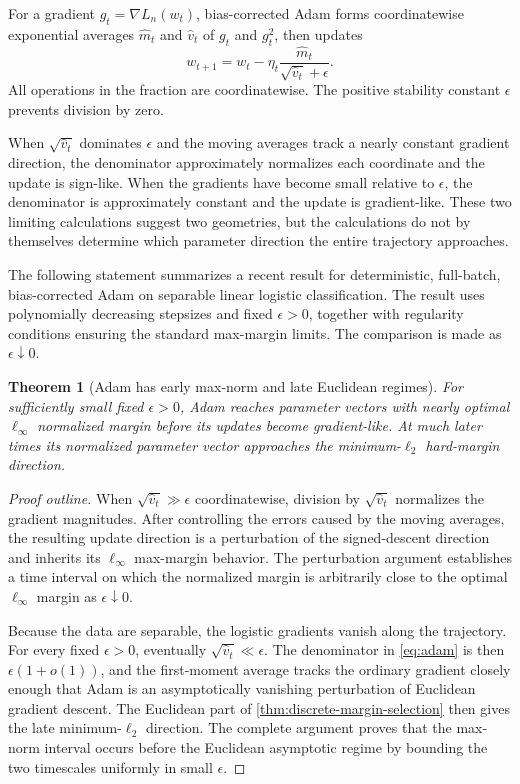 \documentclass[11pt,twoside]{article}
\newtheorem{theorem}{Theorem}[section]
\theoremstyle{definition}
\theoremstyle{remark}
\begin{document}
For a gradient $g_t=\nabla L_n(w_t)$, bias-corrected Adam forms
coordinatewise exponential averages $\widehat m_t$ and $\widehat v_t$ of
$g_t$ and $g_t^2$, then updates
\begin{equation}
 w_{t+1}=w_t-\eta_t
 \frac{\widehat m_t}{\sqrt{\widehat v_t}+\epsilon}.
 \label{eq:adam}
\end{equation}
All operations in the fraction are coordinatewise. The positive stability
constant $\epsilon$ prevents division by zero.

When $\sqrt{\widehat v_t}$ dominates $\epsilon$ and the moving averages
track a nearly constant gradient direction, the denominator approximately
normalizes each coordinate and the update is sign-like. When the gradients
have become small relative to $\epsilon$, the denominator is approximately
constant and the update is gradient-like. These two limiting calculations
suggest two geometries, but the calculations do not by themselves determine
which parameter direction the entire trajectory approaches.

The following statement summarizes a recent result for deterministic,
full-batch, bias-corrected Adam on separable linear logistic classification.
The result uses polynomially decreasing stepsizes and fixed $\epsilon>0$,
together with regularity conditions ensuring the standard max-margin limits. The
comparison is made as $\epsilon\downarrow0$.

\begin{theorem}[Adam has early max-norm and late Euclidean regimes]
\label{thm:adam-two-regimes}
For sufficiently small fixed $\epsilon>0$, Adam reaches parameter vectors with
nearly optimal $\ell_\infty$ normalized margin before its updates become
gradient-like. At much later times its normalized parameter vector approaches
the minimum-$\ell_2$ hard-margin direction.
\end{theorem}

\begin{proof}[Proof outline]
When $\sqrt{\widehat v_t}\gg\epsilon$ coordinatewise, division by
$\sqrt{\widehat v_t}$ normalizes the gradient magnitudes. After controlling
the errors caused by the moving averages, the resulting update direction is a
perturbation of the signed-descent direction and inherits its $\ell_\infty$
max-margin behavior. The perturbation argument establishes a time interval on which the
normalized margin is arbitrarily close to the optimal $\ell_\infty$ margin as
$\epsilon\downarrow0$.

Because the data are separable, the logistic gradients vanish along the
trajectory. For every fixed $\epsilon>0$, eventually
$\sqrt{\widehat v_t}\ll\epsilon$. The denominator in \cref{eq:adam} is then
$\epsilon(1+o(1))$, and the first-moment average tracks the ordinary
gradient closely enough that Adam is an asymptotically vanishing perturbation
of Euclidean gradient descent. The Euclidean part of
\cref{thm:discrete-margin-selection} then gives the late minimum-$\ell_2$
direction.
The complete argument proves that the max-norm interval occurs before the
Euclidean asymptotic regime by bounding the two timescales uniformly in small
$\epsilon$.
\end{proof}
\end{document}
